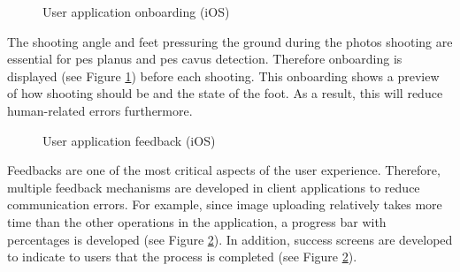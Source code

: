 \begin{figure}[htbp]
\centering
{}
\caption{User application onboarding (iOS)}
\label{fig:UserApplicationOnboarding}
\end{figure}

The shooting angle and feet pressuring the ground during the photos shooting are essential for pes planus and pes cavus detection. Therefore onboarding is displayed (see Figure \ref{fig:UserApplicationOnboarding}) before each shooting. This onboarding shows a preview of how shooting should be and the state of the foot. As a result, this will reduce human-related errors furthermore. 

\begin{figure}[htbp]
\centering
{}
\caption{User application feedback (iOS)}
\label{fig:UserApplicationFeedback}
\end{figure}

Feedbacks are one of the most critical aspects of the user experience. Therefore, multiple feedback mechanisms are developed in client applications to reduce communication errors. For example, since image uploading relatively takes more time than the other operations in the application, a progress bar with percentages is developed (see Figure \ref{fig:UserApplicationFeedback}). In addition, success screens are developed to indicate to users that the process is completed (see Figure \ref{fig:UserApplicationFeedback}).

